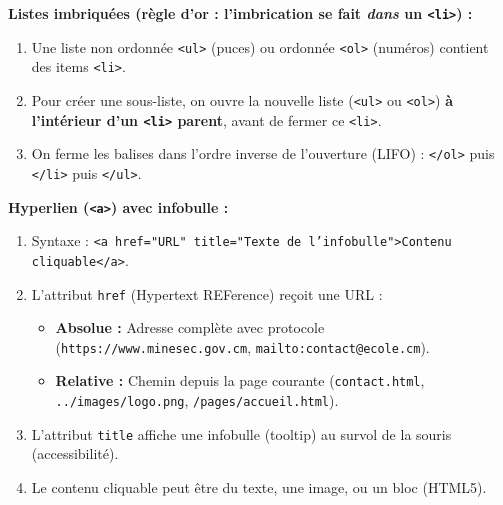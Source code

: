 \documentclass[11pt]{article}
\newcommand{\cle}[1]{{\popxbold\color{popdark}#1}}
\begin{document}
\begin{methode}
\textbf{Listes imbriquées (règle d'or : l'imbrication se fait \emph{dans} un \texttt{<li>}) :}
\begin{enumerate}
  \item Une liste non ordonnée \texttt{<ul>} (puces) ou ordonnée \texttt{<ol>} (numéros) contient des items \texttt{<li>}.
  \item Pour créer une sous-liste, on ouvre la nouvelle liste (\texttt{<ul>} ou \texttt{<ol>}) \textbf{à l'intérieur d'un \texttt{<li>} parent}, avant de fermer ce \texttt{<li>}.
  \item On ferme les balises dans l'ordre inverse de l'ouverture (LIFO) : \texttt{</ol>} puis \texttt{</li>} puis \texttt{</ul>}.
\end{enumerate}

\textbf{Hyperlien (\texttt{<a>}) avec infobulle :}
\begin{enumerate}
  \item Syntaxe : \texttt{<a href="URL" title="Texte de l'infobulle">Contenu cliquable</a>}.
  \item L'attribut \texttt{href} (Hypertext REFerence) reçoit une \cle{URL} :
        \begin{itemize}
          \item \textbf{Absolue :} Adresse complète avec protocole (\texttt{https://www.minesec.gov.cm}, \texttt{mailto:contact@ecole.cm}).
          \item \textbf{Relative :} Chemin depuis la page courante (\texttt{contact.html}, \texttt{../images/logo.png}, \texttt{/pages/accueil.html}).
        \end{itemize}
  \item L'attribut \texttt{title} affiche une \cle{infobulle} (tooltip) au survol de la souris (accessibilité).
  \item Le contenu cliquable peut être du texte, une image, ou un bloc (HTML5).
\end{enumerate}
\end{methode}
\end{document}
